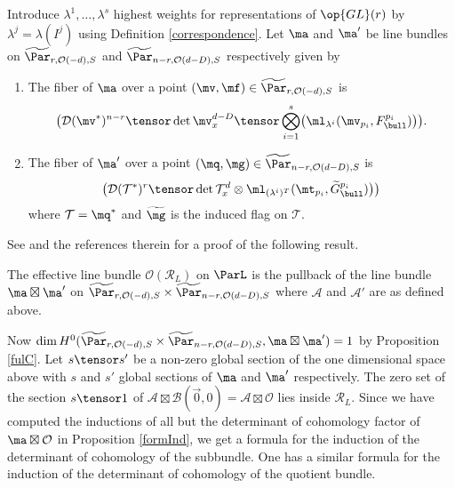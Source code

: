Introduce $\lambda^1,\dots,\lambda^s$ highest weights for representations of $\op{GL}(r)$ by $\lambda^j=\lambda(I^j)$ using Definition  \ref{correspondence}. Let $\ma$ and $\ma'$ be line bundles on $\widetilde{\Par}_{r,\mathcal{O}(-d),S}$ and $\widetilde{\Par}_{n-r,\mathcal{O}(d-D),S}$ respectively given by
\begin{enumerate}
\item The fiber of $\ma$ over a point $(\mv,\mf)\in \widetilde{\Par}_{r,\mathcal{O}(-d),S}$ is
$$\bigl(\mathcal{D}(\mv^*)^{n-r}\tensor \det \mv_x^{d-D}\tensor \bigotimes_{i=1}^s\bigl( \ml_{\lambda^i}(\mv_{p_i},F^{p_i}_{\bull})\bigr)\bigr).$$
\item The fiber of $\ma'$ over a point $(\mq,\mg)\in \widetilde{\Par}_{n-r,\mathcal{O}(d-D),S}$ is
$$\bigl(\mathcal{D}(\mathcal{T}^*)^r\tensor \det \mathcal{T}_x^{d}\otimes \ml_{(\lambda^i)^T}(\mt_{p_i},\widetilde{G}^{p_i}_{\bull})\bigr)\bigr)$$
where $\mathcal{T}=\mq^*$ and $\widetilde{\mg}$ is the induced flag on $\mathcal{T}$.
\end{enumerate}
See \cite[Section 11]{BGM} and the references therein for a proof of the following result.
\begin{proposition}
\notready\label{basicC}
The effective line bundle $\mathcal{O}(\mathcal{R}_L)$ on $\ParL$ is the pullback of the line bundle $\ma\boxtimes \ma'$ on $\widetilde{\Par}_{r,\mathcal{O}(-d),S}\times \widetilde{\Par}_{n-r,\mathcal{O}(d-D),S}$ where $\mathcal{A}$ and $\mathcal{A}'$ are as defined above.
\end{proposition}

Now $\dim H^0(\widetilde{\Par}_{r,\mathcal{O}(-d),S}\times \widetilde{\Par}_{n-r,\mathcal{O}(d-D),S},\ma\boxtimes\ma')=1$ by Proposition \ref{fulC}.  Let $s\tensor s'$ be a non-zero global section of the one dimensional space above  with $s$ and $s'$ global sections of  $\ma$ and $\ma'$ respectively. The zero set of the section $s\tensor 1$ of $\mathcal{A}\boxtimes \mathcal{B}(\vec{0},0)=\mathcal{A}\boxtimes \mathcal{O}$ lies inside $\mathcal{R}_L$. Since we have computed the inductions of all but the determinant of cohomology factor of $\ma\boxtimes\mathcal{O}$ in Proposition \ref{formInd}, we get a formula for the induction of the determinant of cohomology of the subbundle. One has a similar formula for the induction of the determinant of cohomology of the quotient bundle.




